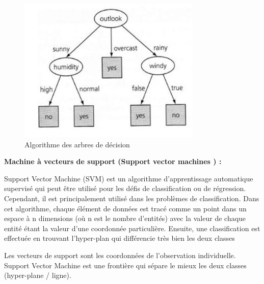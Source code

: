 \begin{figure}[H]
\begin{center}
\includegraphics[width=0.8\linewidth]{images/treedecision.JPG}
\end{center}
\caption{Algorithme des arbres de décision}
\label{fig:8}
\end{figure}


\textbf{Machine à vecteurs de support (Support vector machines ) : }

Support Vector Machine (SVM) est un algorithme d'apprentissage automatique supervisé qui peut être utilisé pour les défis de classification ou de régression. Cependant, il est principalement utilisé dans les problèmes de classification. Dans cet algorithme, chaque élément de données est tracé comme un point dans un espace à n dimensions (où n est le nombre d'entités) avec la valeur de chaque entité étant la valeur d'une coordonnée particulière. Ensuite, une classification est effectuée en trouvant l'hyper-plan qui différencie très bien les deux classes

Les vecteurs de support sont les coordonnées de l'observation individuelle. Support Vector Machine est une frontière qui sépare le mieux les deux classes (hyper-plane / ligne).


